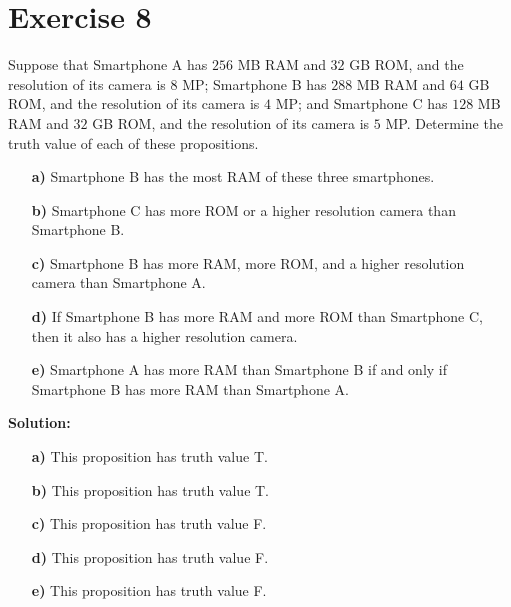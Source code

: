 \documentclass{Axon}
\begin{document}
\section*{Exercise 8}
Suppose that Smartphone A has \(256\) MB RAM and \(32\) GB ROM, and the resolution of its camera is \(8\) MP; Smartphone B has \(288\) MB RAM and \(64\) GB ROM, and the resolution of its camera is \(4\) MP; and Smartphone C has \(128\) MB RAM and \(32\) GB ROM, and the resolution of its camera is \(5\) MP. Determine the truth value of each of these propositions.
\begin{enumerate}
    \item[\textbf{a)}] Smartphone B has the most RAM of these three smartphones.
    \item[\textbf{b)}] Smartphone C has more ROM or a higher resolution camera than Smartphone B.
    \item[\textbf{c)}] Smartphone B has more RAM, more ROM, and a higher resolution camera than Smartphone A.
    \item[\textbf{d)}] If Smartphone B has more RAM and more ROM than Smartphone C, then it also has a higher resolution camera.
    \item[\textbf{e)}] Smartphone A has more RAM than Smartphone B if and only if Smartphone B has more RAM than Smartphone A.
\end{enumerate}

\noindent
\textbf{Solution:}\begin{enumerate}
    \item[\textbf{a)}] This proposition has truth value T.
    \item[\textbf{b)}] This proposition has truth value T.
    \item[\textbf{c)}] This proposition has truth value F.
    \item[\textbf{d)}] This proposition has truth value F.
    \item[\textbf{e)}] This proposition has truth value F.
\end{enumerate}
\end{document}
